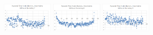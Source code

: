 \documentclass{beamer}
\begin{document}
\begin{frame}
\begin{figure}
\begin{minipage}[b]{0.2\textwidth}
    \centering 
    \includegraphics[width=1in]{unclustered7.png} 
  \end{minipage}%
  \hspace{0.04\linewidth}%
  \begin{minipage}[b]{0.2\textwidth} 
    \centering 
    \includegraphics[width=1in]{unclustered8.png} 
  \end{minipage} 
  \hspace{0.04\linewidth}%
  \begin{minipage}[b]{0.2\textwidth} 
    \centering 
    \includegraphics[width=1in]{unclustered9.png} 
  \end{minipage}
\end{figure}
\end{frame}
\end{document}
